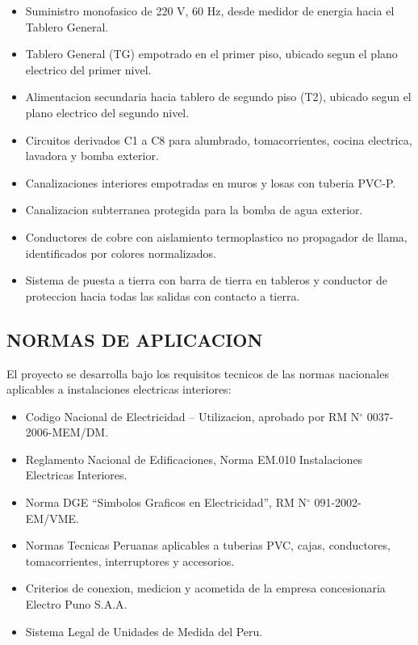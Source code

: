 \begin{itemize}
  \item Suministro monofasico de 220 V, 60 Hz, desde medidor de energia hacia el Tablero General.
  \item Tablero General (TG) empotrado en el primer piso, ubicado segun el plano electrico del primer nivel.
  \item Alimentacion secundaria hacia tablero de segundo piso (T2), ubicado segun el plano electrico del segundo nivel.
  \item Circuitos derivados C1 a C8 para alumbrado, tomacorrientes, cocina electrica, lavadora y bomba exterior.
  \item Canalizaciones interiores empotradas en muros y losas con tuberia PVC-P.
  \item Canalizacion subterranea protegida para la bomba de agua exterior.
  \item Conductores de cobre con aislamiento termoplastico no propagador de llama, identificados por colores normalizados.
  \item Sistema de puesta a tierra con barra de tierra en tableros y conductor de proteccion hacia todas las salidas con contacto a tierra.
\end{itemize}

\subsection{NORMAS DE APLICACION}

El proyecto se desarrolla bajo los requisitos tecnicos de las normas nacionales aplicables a instalaciones electricas interiores:

\begin{itemize}
  \item Codigo Nacional de Electricidad -- Utilizacion, aprobado por RM N\(^\circ\) 0037-2006-MEM/DM.
  \item Reglamento Nacional de Edificaciones, Norma EM.010 Instalaciones Electricas Interiores.
  \item Norma DGE ``Simbolos Graficos en Electricidad'', RM N\(^\circ\) 091-2002-EM/VME.
  \item Normas Tecnicas Peruanas aplicables a tuberias PVC, cajas, conductores, tomacorrientes, interruptores y accesorios.
  \item Criterios de conexion, medicion y acometida de la empresa concesionaria Electro Puno S.A.A.
  \item Sistema Legal de Unidades de Medida del Peru.
\end{itemize}


